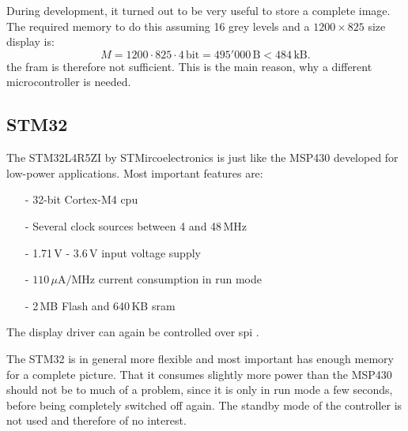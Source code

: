 During development, it turned out to be very useful to store a complete image.
The required memory to do this assuming 16 grey levels and a $1200\times 825$ size display is:
$$M = 1200\cdot 825\cdot4\,\text{bit}=495'000\,\text{B} < 484\,\text{kB}.$$
the \acs{fram} is therefore not sufficient.
This is the main reason, why a different microcontroller is needed.

\subsection{STM32}
The STM32L4R5ZI by STMircoelectronics is just like the MSP430 developed for low-power applications.
Most important features are:
\begin{itemize}
	\item[-] 32-bit Cortex-M4 \acs{cpu}
	\item[-] Several clock sources between 4 and 48\,MHz
	\item[-] 1.71\,V - 3.6\,V input voltage supply
	\item[-] $110\,\mu \text{A}/\text{MHz}$ current consumption in run mode
	\item[-] 2\,MB Flash and 640\,KB \acs{sram}
\end{itemize}
The display driver can again be controlled over \acs{spi} \cite{stm32}.

The STM32 is in general more flexible and most important has enough memory for a complete picture.
That it consumes slightly more power than the MSP430 should not be to much of a problem, since it is only in run mode a few seconds, before being completely switched off again.
The standby mode of the controller is not used and therefore of no interest.


